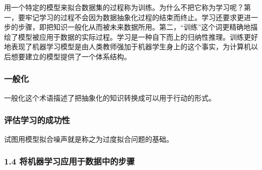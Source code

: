 \documentclass[11pt]{article}
\begin{document}
用一个特定的模型来拟合数据集的过程称为训练。为什么不把它称为学习呢？第一，要牢记学习的过程不会因为数据抽象化过程的结束而终止。学习还要求更进一步的步骤，即把知识一般化从而被未来数据所用。第二，“训练”这个词更精确地描绘了模型被应用于数据的实际过程。学习是一种自下而上的归纳性推理。训练更好地表现了机器学习模型是由人类教师强加于机器学生身上的这个事实，为计算机以后想要建立的模型提供了一个体系结构。
\subsubsection{一般化}
\label{sec:orgd8e0fae}
一般化这个术语描述了把抽象化的知识转换成可以用于行动的形式。
\subsubsection{评估学习的成功性}
\label{sec:orgb6edc94}
试图用模型拟合噪声就是称之为过度拟合问题的基础。
\subsubsection{1.4 将机器学习应用于数据中的步骤}
\label{sec:org08feb26}
\end{document}
